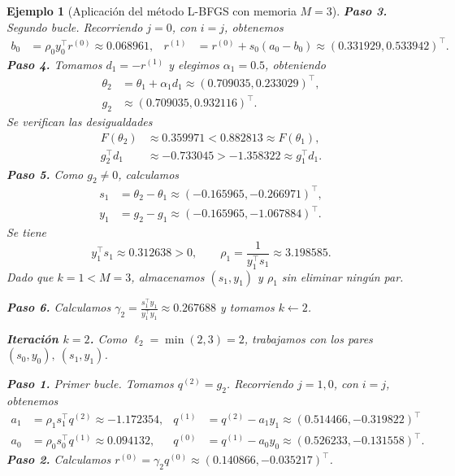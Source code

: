 \documentclass[a4paper,openany,oneside,10pt]{report}
\theoremstyle{pnlTeorema}
\theoremstyle{pnlDefinicion}
\theoremstyle{pnlObservacion}
\newtheorem{ejemplo}{Ejemplo}[section]
\begin{document}
\begin{ejemplo}[Aplicación del método L-BFGS con memoria $M=3$]
\noindent\textbf{Paso 3.} Segundo bucle. Recorriendo $j=0$, con $i=j$, obtenemos
\[
\begin{aligned}
    b_0&=\rho_0y_0^\top r^{(0)}\approx 0.068961, & r^{(1)}&=r^{(0)}+s_0(a_0-b_0)\approx (0.331929,0.533942)^\top.
\end{aligned}
\]
\noindent\textbf{Paso 4.} Tomamos $d_1=-r^{(1)}$ y elegimos $\alpha_1=0.5$, obteniendo
\[
\begin{aligned}
    \theta_2&=\theta_1+\alpha_1d_1\approx (0.709035,0.233029)^\top,\\
    g_2&\approx (0.709035,0.932116)^\top.
\end{aligned}
\]
Se verifican las desigualdades
\[
\begin{aligned}
    F(\theta_2)&\approx 0.359971<0.882813\approx F(\theta_1),\\
    g_2^\top d_1&\approx -0.733045>-1.358322\approx g_1^\top d_1.
\end{aligned}
\]
\noindent\textbf{Paso 5.} Como $g_2\ne0$, calculamos
\[
\begin{aligned}
    s_1&=\theta_2-\theta_1\approx (-0.165965,-0.266971)^\top,\\
    y_1&=g_2-g_1\approx (-0.165965,-1.067884)^\top.
\end{aligned}
\]
Se tiene
\[
    y_1^\top s_1\approx 0.312638>0,\qquad
    \rho_1=\frac{1}{y_1^\top s_1}\approx 3.198585.
\]
Dado que $k=1<M=3$, almacenamos $(s_1,y_1)$ y $\rho_1$ sin eliminar ningún par.

\noindent\textbf{Paso 6.} Calculamos $\gamma_2=\frac{s_1^\top y_1}{y_1^\top y_1}\approx 0.267688$ y tomamos $k\leftarrow2$.

\smallskip
\noindent\textbf{Iteración $k=2$.} Como $\ell_2=\min(2,3)=2$, trabajamos con los pares $(s_0,y_0),\ (s_1,y_1)$.

\noindent\textbf{Paso 1.} Primer bucle. Tomamos $q^{(2)}=g_2$. Recorriendo $j=1,0$, con $i=j$, obtenemos
\[
\begin{aligned}
    a_1&=\rho_1s_1^\top q^{(2)}\approx -1.172354, & q^{(1)}&=q^{(2)}-a_1y_1\approx (0.514466,-0.319822)^\top\\
    a_0&=\rho_0s_0^\top q^{(1)}\approx 0.094132, & q^{(0)}&=q^{(1)}-a_0y_0\approx (0.526233,-0.131558)^\top.
\end{aligned}
\]
\noindent\textbf{Paso 2.} Calculamos $r^{(0)}=\gamma_2q^{(0)}\approx (0.140866,-0.035217)^\top$.


\end{ejemplo}
\end{document}
